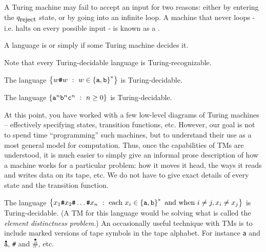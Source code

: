 \documentclass[twoside,letterpaper,openany]{book}
\begin{document}
\begin{defn}[Decider]
A Turing machine may fail to accept an input for two reasons: either by entering the $q_\textrm{\small reject}$ state, or by going into an infinite loop. A machine that never loops - i.e. halts on every possible input - is known as a . 
\end{defn}

\begin{defn}
A language is  or simply  if some Turing machine decides it.

Note that every Turing-decidable language is Turing-recognizable.
\end{defn}

\begin{stmt}
The language $\left\lbrace w\texttt{\#}w\ :\ w \in \left\lbrace \texttt{a}, \texttt{b} \right\rbrace^{*} \right\rbrace$ is Turing-decidable.
\end{stmt}

\begin{stmt}
The language $\left\lbrace \texttt{a}^n \texttt{b}^n \texttt{c}^n\ :\  n \geq 0  \right\rbrace$ is Turing-decidable.
\end{stmt}

\begin{discussion}
At this point, you have worked with a few low-level diagrams of Turing machines -- effectively specifying states, transition functions, etc. However, our goal is not to spend time ``programming'' such machines, but to understand their use as a most general model for computation. Thus, once the capabilities of TMs are understood, it is much easier to simply give an informal prose description of how a machine works for a particular problem: how it moves it head, the ways it reads and writes data on its tape, etc. We do not have to give exact details of every state and the transition function.
\end{discussion}

\begin{stmt}
The language $\left\lbrace x_1\texttt{\#}x_2\texttt{\#}\ldots\texttt{\#}x_n\ :\ \textrm{each}~x_i \in \left\lbrace \texttt{a}, \texttt{b} \right\rbrace^{*}
	~\textrm{and when}~ i \neq j, x_i \neq x_j \right\rbrace$ is Turing-decidable. (A TM for this language would be solving what is called the \emph{element distinctness problem}.)
\hint An occasionally useful technique with TMs is to include marked versions of tape symbols in the tape alphabet. For instance \texttt{a} and $\overset{\bullet}{\texttt{a}}$, \texttt{\#} and $\overset{\bullet}{\texttt{\#}}$, etc.
\end{stmt}
\end{document}
